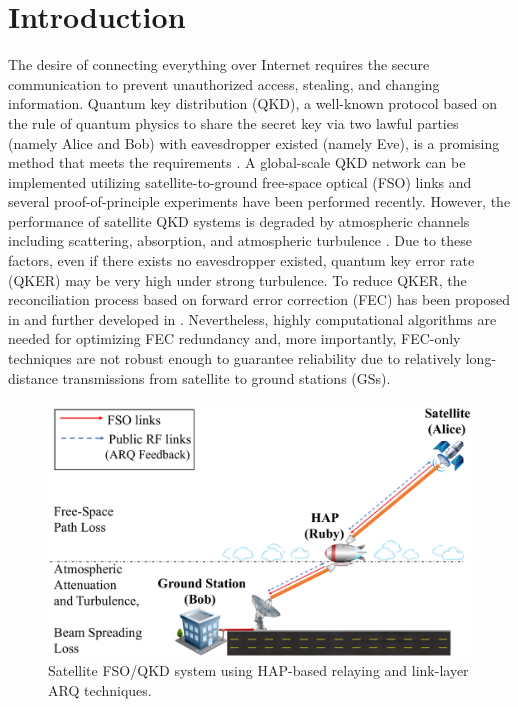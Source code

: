 \documentclass[conference]{IEEEtran}
\begin{document}
\section{Introduction}
The desire of connecting everything over Internet requires the secure communication to prevent unauthorized access, stealing, and changing information. Quantum key distribution (QKD), a well-known protocol based on the rule of quantum physics to share the secret key via two lawful parties (namely Alice and Bob) with eavesdropper existed (namely Eve), is a promising method that meets the requirements \cite{Yuen2016}. A global-scale QKD network can be implemented utilizing satellite-to-ground free-space optical (FSO) links and several proof-of-principle experiments have been performed recently. However, the performance of satellite QKD systems is degraded by atmospheric channels including scattering, absorption, and atmospheric turbulence \cite{Vallone2015, Liao2018}. Due to these factors, even if there exists no eavesdropper existed, quantum key error rate (QKER) may be very high under strong turbulence. To reduce QKER, the reconciliation process based on forward error correction (FEC) has been proposed in \cite{Buttler2003} and further developed in \cite{Ai2020}. Nevertheless, highly computational algorithms are needed for optimizing FEC redundancy and, more importantly, FEC-only techniques are not robust enough to guarantee reliability due to relatively long-distance transmissions from satellite to ground stations (GSs). 

\begin{figure}[t]
\begin{center}
\includegraphics[width=0.9\columnwidth,height=.2\textheight]{Figures/Figure1.pdf}
\end{center}
\caption{Satellite FSO/QKD system using HAP-based relaying and link-layer ARQ techniques.}
\label{fig:Scheme}
\end{figure}
\end{document}
